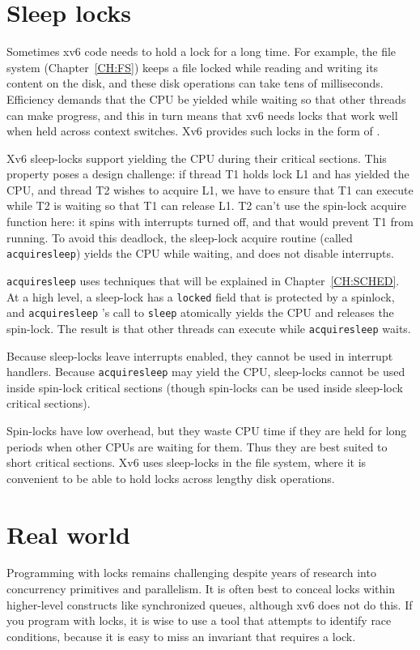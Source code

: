 \section{Sleep locks}

Sometimes xv6 code needs to hold a lock for a long time. For example,
the file system (Chapter~\ref{CH:FS}) keeps a file locked while reading
and writing its content on the disk, and these disk operations can
take tens of milliseconds. Efficiency demands that the CPU be
yielded while waiting so that other threads can make
progress, and this in turn means that xv6 needs locks that 
work well when held across context switches.
Xv6 provides such locks in the form of
.

Xv6 sleep-locks support yielding the CPU during their critical
sections. This property poses a design challenge: if thread T1 holds
lock L1 and has yielded the CPU, and thread T2 wishes to acquire
L1, we have to ensure that T1 can execute while T2 is waiting so
that T1 can release L1. T2 can't use the spin-lock acquire
function here: it
spins with interrupts turned off, and that would prevent T1
from running. To avoid this deadlock, the sleep-lock acquire
routine
(called
\lstinline{acquiresleep})
yields the CPU while waiting, and does not disable
interrupts.

\lstinline{acquiresleep}
uses techniques that will be explained in
Chapter~\ref{CH:SCHED}.
At a high level, a sleep-lock has a
\lstinline{locked}
field that is protected by a spinlock, and 
\lstinline{acquiresleep} 's
call to
\lstinline{sleep}
atomically yields the CPU and releases the spin-lock.
The result is that other threads can execute while
\lstinline{acquiresleep}
waits.

Because sleep-locks leave interrupts enabled, they cannot be
used in interrupt handlers.
Because
\lstinline{acquiresleep}
may yield the CPU,
sleep-locks cannot be used inside spin-lock critical
sections (though spin-locks can be used inside sleep-lock
critical sections).

Spin-locks have low overhead, but they waste CPU time if they
are held for long periods when other CPUs are waiting
for them.
Thus they are best suited to short critical sections.
Xv6 uses sleep-locks in the file system,
where it is convenient to
be able to hold locks across lengthy disk operations.
\section{Real world}
Programming with locks remains challenging despite years of research
into concurrency primitives and parallelism.
It is often best to conceal locks within 
higher-level constructs like synchronized queues, although xv6 does not
do this.  If you program with locks, it is wise to use a tool that attempts to
identify race conditions, because it is easy to miss an invariant that requires
a lock.

